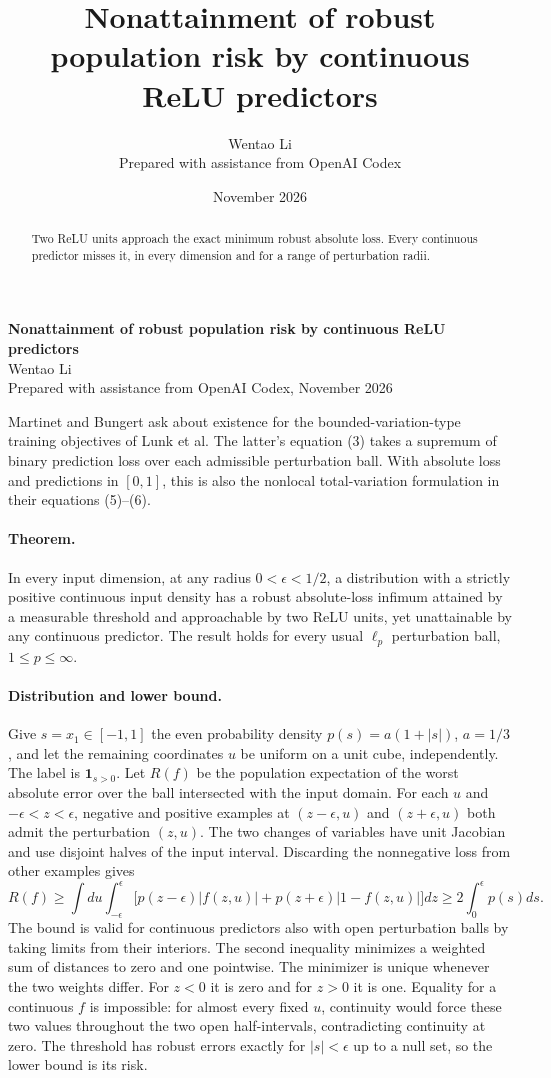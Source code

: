 \documentclass[10pt]{article}
\title{Nonattainment of robust population risk by continuous ReLU predictors}
\author{Wentao Li\\{\small Prepared with assistance from OpenAI Codex}}
\date{November 2026}
\begin{document}
\begin{center}{\Large\bfseries Nonattainment of robust population risk by continuous ReLU predictors}\\[3pt]Wentao Li\\{\small Prepared with assistance from OpenAI Codex, November 2026}\end{center}
\begin{abstract}
Two ReLU units approach the exact minimum robust absolute loss. Every continuous predictor misses it, in every dimension and for a range of perturbation radii.
\end{abstract}
Martinet and Bungert ask about existence for the bounded-variation-type training objectives of Lunk et al. The latter's equation (3) takes a supremum of binary prediction loss over each admissible perturbation ball. With absolute loss and predictions in $[0,1]$, this is also the nonlocal total-variation formulation in their equations (5)--(6).

\paragraph{Theorem.} In every input dimension, at any radius $0<\epsilon<1/2$, a distribution with a strictly positive continuous input density has a robust absolute-loss infimum attained by a measurable threshold and approachable by two ReLU units, yet unattainable by any continuous predictor. The result holds for every usual $\ell_p$ perturbation ball, $1\le p\le\infty$.

\paragraph{Distribution and lower bound.} Give $s=x_1\in[-1,1]$ the even probability density $p(s)=a(1+|s|)$, $a=1/3$, and let the remaining coordinates $u$ be uniform on a unit cube, independently. The label is $\mathbf1_{s>0}$. Let $R(f)$ be the population expectation of the worst absolute error over the ball intersected with the input domain. For each $u$ and $-\epsilon<z<\epsilon$, negative and positive examples at $(z-\epsilon,u)$ and $(z+\epsilon,u)$ both admit the perturbation $(z,u)$. The two changes of variables have unit Jacobian and use disjoint halves of the input interval. Discarding the nonnegative loss from other examples gives
\[
R(f)\ge\int du\int_{-\epsilon}^{\epsilon}
 \big[p(z-\epsilon)|f(z,u)|+p(z+\epsilon)|1-f(z,u)|\big]dz
\ge 2\int_0^\epsilon p(s)ds .
\]
The bound is valid for continuous predictors also with open perturbation balls by taking limits from their interiors. The second inequality minimizes a weighted sum of distances to zero and one pointwise. The minimizer is unique whenever the two weights differ. For $z<0$ it is zero and for $z>0$ it is one. Equality for a continuous $f$ is impossible: for almost every fixed $u$, continuity would force these two values throughout the two open half-intervals, contradicting continuity at zero. The threshold has robust errors exactly for $|s|<\epsilon$ up to a null set, so the lower bound is its risk.
\end{document}
